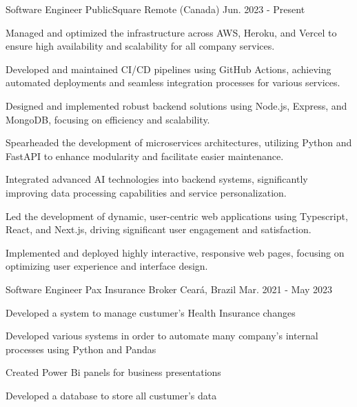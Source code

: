 

\begin{cventries}

\cventry
{Software Engineer} %
{PublicSquare} %
{Remote (Canada)} %
{Jun. 2023 - Present} %
{
  \begin{cvitems} %
    \item {Managed and optimized the infrastructure across AWS, Heroku, and Vercel to ensure high availability and scalability for all company services.}
    \item{Developed and maintained CI/CD pipelines using GitHub Actions, achieving automated deployments and seamless integration processes for various services.}
    \item{Designed and implemented robust backend solutions using Node.js, Express, and MongoDB, focusing on efficiency and scalability.}
    \item{Spearheaded the development of microservices architectures, utilizing Python and FastAPI to enhance modularity and facilitate easier maintenance.}
    \item{Integrated advanced AI technologies into backend systems, significantly improving data processing capabilities and service personalization.}
    \item{Led the development of dynamic, user-centric web applications using Typescript, React, and Next.js, driving significant user engagement and satisfaction.}
    \item{Implemented and deployed highly interactive, responsive web pages, focusing on optimizing user experience and interface design.}
  \end{cvitems}
}



  \cventry
    {Software Engineer} %
    {Pax Insurance Broker} %
    {Ceará, Brazil} %
    {Mar. 2021 - May 2023} %
    {
      \begin{cvitems} %
        \item {Developed a system to manage custumer's Health Insurance changes}
        \item {Developed various systems in order to automate many company's internal processes using Python and Pandas}
        \item {Created Power Bi panels for business presentations}
        \item {Developed a database to store
        all custumer's data}
      \end{cvitems}
    }


\end{cventries}
